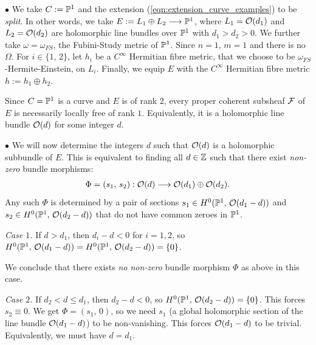 \documentclass[12pt]{article}
\begin{document}
 $\bullet$ We take $C:=\mathbb{P}^1$ and the extension (\ref{eqn:extension_curve_examples}) to be {\it split}. In other words, we take $E:=L_1\oplus L_2\longrightarrow\mathbb{P}^1$, where $L_1={\cal O}(d_1)$ and $L_2={\cal O}(d_2)$ are holomorphic line bundles over $\mathbb{P}^1$ with $d_1>d_2>0$. We further take $\omega = \omega_{FS}$, the Fubini-Study metric of $\mathbb{P}^1$. Since $n=1$, $m=1$ and there is no $\Omega$. For $i\in\{1,\,2\}$, let $h_i$ be a $C^\infty$ Hermitian fibre metric, that we choose to be $\omega_{FS}$-Hermite-Einstein, on $L_i$. Finally, we equip $E$ with the $C^\infty$ Hermitian fibre metric $h:=h_1\oplus h_2$.

Since $C=\mathbb{P}^1$ is a curve and $E$ is of rank $2$, every proper coherent subsheaf ${\cal F}$ of $E$ is necessarily locally free of rank $1$. Equivalently, it is a holomorphic line bundle ${\cal O}(d)$ for some integer $d$.

\vspace{1ex}

$\bullet$ We will now determine the integers $d$ such that ${\cal O}(d)$ is a holomorphic subbundle of $E$. This is equivalent to finding all $d\in\mathbb{Z}$ such that there exist {\it non-zero} bundle morphisms: \begin{eqnarray*}\Phi = (s_1,\,s_2):{\cal O}(d)\longrightarrow {\cal O}(d_1)\oplus{\cal O}(d_2).\end{eqnarray*} Any such $\Phi$ is determined by a pair of sections $s_1\in H^0(\mathbb{P}^1,\,{\cal O}(d_1-d))$ and $s_2\in H^0(\mathbb{P}^1,\,{\cal O}(d_2-d))$ that do not have common zeroes in $\mathbb{P}^1$.

\vspace{1ex}

{\it Case $1$.} If $d>d_1$, then $d_i-d<0$ for $i=1,2$, so $H^0(\mathbb{P}^1,\,{\cal O}(d_1-d)) = H^0(\mathbb{P}^1,\,{\cal O}(d_2-d)) = \{0\}$.

We conclude that there exists {\it no non-zero} bundle morphism $\Phi$ as above in this case.

\vspace{1ex}

{\it Case $2$.} If $d_2<d\leq d_1$, then $d_2-d<0$, so $H^0(\mathbb{P}^1,\,{\cal O}(d_2-d)) = \{0\}$. This forces $s_2\equiv 0 $. We get $\Phi = (s_1,\,0)$, so we need $s_1$ (a global holomorphic section of the line bundle ${\cal O}(d_1-d)$) to be non-vanishing. This forces ${\cal O}(d_1-d)$ to be trivial. Equivalently, we must have $d=d_1$.
\end{document}

